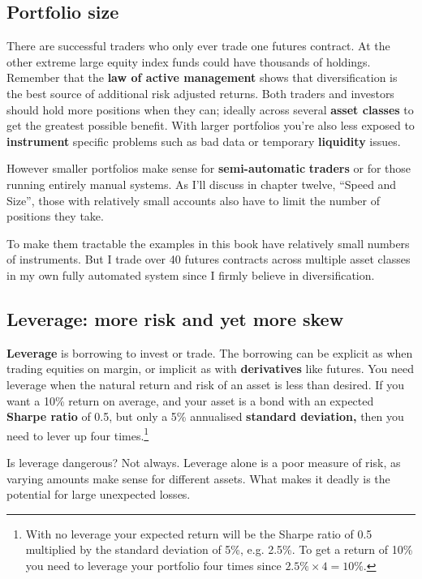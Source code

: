 \subsection*{Portfolio size}

There are successful traders who only ever trade one futures contract. At the other extreme large equity index funds could have thousands of holdings. Remember that the \textbf{law of active management} shows that diversification is the best source of additional risk adjusted returns. Both traders and investors should hold more positions when they can; ideally across several \textbf{asset classes} to get the greatest possible benefit. With larger portfolios you're also less exposed to \textbf{instrument} specific problems such as bad data or temporary \textbf{liquidity} issues.

However smaller portfolios make sense for \textbf{semi-automatic} \textbf{traders} or for those running entirely manual systems. As I'll discuss in chapter twelve, ``Speed and Size'', those with relatively small accounts also have to limit the number of positions they take.

To make them tractable the examples in this book have relatively small numbers of instruments. But I trade over 40 futures contracts across multiple asset classes in my own fully automated system since I firmly believe in diversification.

\subsection*{Leverage: more risk and yet more skew}

\textbf{Leverage} is borrowing to invest or trade. The borrowing can be explicit as when trading equities on margin, or implicit as with \textbf{derivatives} like futures. You need leverage when the natural return and risk of an asset is less than desired. If you want a 10\% return on average, and your asset is a bond with an expected \textbf{Sharpe ratio} of 0.5, but only a 5\% annualised \textbf{standard deviation,} then you need to lever up four times.\footnote{With no leverage your expected return will be the Sharpe ratio of 0.5 multiplied by the standard deviation of 5\%, e.g. 2.5\%. To get a return of 10\% you need to leverage your portfolio four times since $2.5\% \times 4 = 10\%$.}

Is leverage dangerous? Not always. Leverage alone is a poor measure of risk, as varying amounts make sense for different assets. What makes it deadly is the potential for large unexpected losses.


